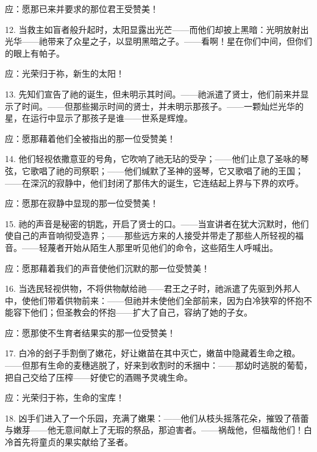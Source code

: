 应：愿那已来并要求的那位君王受赞美！\par

12. 当救主如盲者般升起时，太阳显露出光芒——而他们却披上黑暗：光明放射出光华——祂带来了众星之子，以显明黑暗之子。——看啊！星在你们中间，但你们的眼上有帕子。\par

应：光荣归于祢，新生的太阳！\par

13. 先知们宣告了祂的诞生，但未明示其时间。——祂派遣了贤士，他们前来并显示了时间。——但那些揭示时间的贤士，并未明示那孩子。——一颗灿烂光华的星，在运行中显示了那孩子是谁——世系是辉煌。\par

应：愿那藉着他们全被指出的那一位受赞美！\par

14. 他们轻视依撒意亚的号角，它吹响了祂无玷的受孕；——他们止息了圣咏的琴弦，它歌唱了祂的司祭职；——他们缄默了圣神的竖琴，它又歌唱了祂的王国；——在深沉的寂静中，他们封闭了那伟大的诞生，它连结起上界与下界的欢呼。\par

应：愿那在寂静中显现的那一位受赞美！\par

15. 祂的声音是秘密的钥匙，开启了贤士的口。——当宣讲者在犹大沉默时，他们使自己的声音响彻受造界；——那些远方来的人接受并带走了那些人所轻视的福音。——轻蔑者开始从陌生人那里听见他们的命令，这些陌生人呼喊出。\par

应：愿那藉着我们的声音使他们沉默的那一位受赞美！\par

16. 当选民轻视供物，不将供物献给祂——君王之子时，祂派遣了先驱到外邦人中，使他们带着供物前来：——但祂并未使他们全部前来，因为白冷狭窄的怀抱不能容下他们；但圣教会的怀抱——扩大了自己，容纳了她的子女。\par

应：愿那使不生育者结果实的那一位受赞美！\par

17. 白冷的刽子手割倒了嫩花，好让嫩苗在其中灭亡，嫩苗中隐藏着生命之粮。——但那有生命的麦穗逃脱了，好来到收割时的禾捆中：——那幼时逃脱的葡萄，把自己交给了压榨——好使它的酒赐予灵魂生命。\par

应：光荣归于祢，生命的宝库！\par

18. 凶手们进入了一个乐园，充满了嫩果：——他们从枝头摇落花朵，摧毁了蓓蕾与嫩芽——他无意间献上了无瑕的祭品，那迫害者。——祸哉他，但福哉他们！白冷首先将童贞的果实献给了圣者。\par

